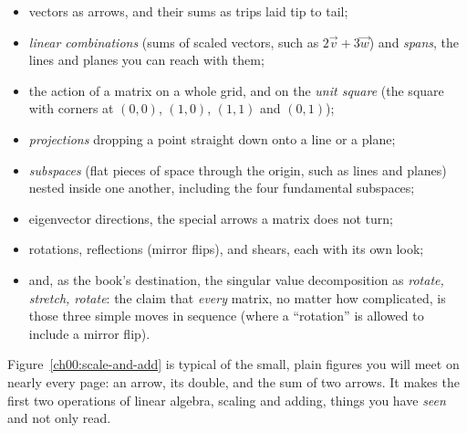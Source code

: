 \begin{itemize}
\item vectors as arrows, and their sums as trips laid tip to tail;
\item \emph{linear combinations} (sums of scaled vectors, such as $2\vec{v}+3\vec{w}$)
and \emph{spans}, the lines and planes you can reach with them;
\item the action of a matrix on a whole grid, and on the \emph{unit square} (the
square with corners at $(0,0)$, $(1,0)$, $(1,1)$ and $(0,1)$);
\item \emph{projections} dropping a point straight down onto a line or a plane;
\item \emph{subspaces} (flat pieces of space through the origin, such as lines and
planes) nested inside one another, including the four fundamental subspaces;
\item eigenvector directions, the special arrows a matrix does not turn;
\item rotations, reflections (mirror flips), and shears, each with its own look;
\item and, as the book's destination, the singular value decomposition as
\emph{rotate, stretch, rotate}: the claim that \emph{every} matrix, no matter
how complicated, is those three simple moves in sequence (where a ``rotation''
is allowed to include a mirror flip).
\end{itemize}

Figure~\ref{ch00:scale-and-add} is typical of the small, plain figures you will meet
on nearly every page: an arrow, its double, and the sum of two arrows. It makes
the first two operations of linear algebra, scaling and adding, things you have
\emph{seen} and not only read.


